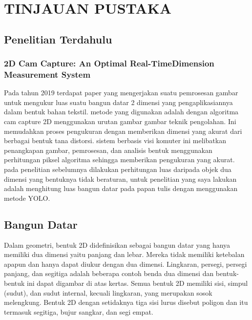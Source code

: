 \chapter{TINJAUAN PUSTAKA}
\label{chap:tinjauanpustaka}
\section{Penelitian Terdahulu}
\label{sec:penelitianterdahulu}
\subsection{2D Cam Capture: An Optimal Real-TimeDimension Measurement System}
\label{subsec:2Dmeasure}

Pada tahun 2019 terdapat paper yang mengerjakan suatu pemrosesan gambar untuk mengukur luas suatu bangun datar 2 dimensi yang pengaplikasiannya dalam bentuk bahan tekstil. metode yang digunakan adalah dengan algoritma cam capture 2D menggunakan urutan gambar gambar teknik pengolahan. Ini memudahkan proses pengukuran dengan memberikan dimensi yang akurat dari berbagai bentuk tana distorsi. sistem berbasis visi komuter ini melibatkan penangkapan gambar, pemrosesan, dan analisis bentuk menggunakan perhitungan piksel algoritma sehingga memberikan pengukuran yang akurat\citep{2Dmeasure}. pada penelitian sebelumnya dilakukan perhitungan luas daripada objek dua dimensi yang bentuknya tidak beraturan, untuk penelitian yang saya lakukan adalah menghitung luas bangun datar pada papan tulis dengan menggunakan metode YOLO.

\section{Bangun Datar}
\label{subsec:BangunDatar}
Dalam geometri, bentuk 2D didefinisikan sebagai bangun datar yang hanya memiliki dua dimensi yaitu panjang dan lebar. Mereka tidak memiliki ketebalan apapun dan hanya dapat diukur dengan dua dimensi. Lingkaran, persegi, persegi panjang, dan segitiga adalah beberapa contoh benda dua dimensi dan bentuk-bentuk ini dapat digambar di atas kertas. Semua bentuk 2D memiliki sisi, simpul (sudut), dan sudut internal, kecuali lingkaran, yang merupakan sosok melengkung. Bentuk 2D dengan setidaknya tiga sisi lurus disebut poligon dan itu termasuk segitiga, bujur sangkar, dan segi empat.\citep{BRIBIESCA1992483}

